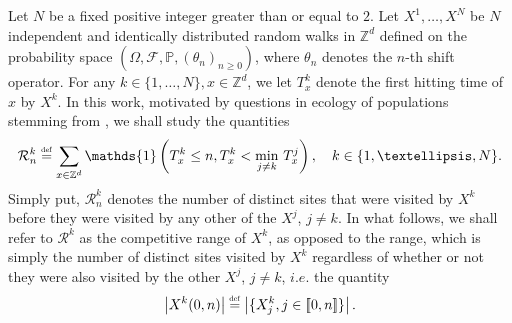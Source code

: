 \documentclass[10pt,a4paper]{amsart}
\newcommand{\R}{\mathcal R}
\newcommand{\PP}{\mathbb P}
\newcommand{\1}{\mathds{1}}
\newcommand{\ZZ}{\mathbb Z}
\newcommand{\eqdef}{\stackrel{\scaleto{\mathrm{def}}{3.5pt}}{=}}
\numberwithin{equation}{section}
\begin{document}
Let $N$ be a fixed positive integer greater than or equal to $2$. Let $X^1,\dots,X^N$ be $N$ independent and identically distributed random walks in $\ZZ^d$ defined on the probability space $\left(\Omega,\mathcal F,\PP,\left(\theta_n\right)_{n\ge0}\right)$, where $\theta_n$ denotes the $n$-th shift operator. For any $k\in\{1,\dots,N\},x\in\ZZ^d$, we let $T_x^k$ denote the first hitting time of $x$ by $X^k$. In this work, motivated by questions in ecology of populations stemming from \cite{Bansaye2024}, we shall study the quantities
\begin{equation*}
    \R_n^k\eqdef\sum_{x\in\ZZ^d}\1\left(T_x^k\le n,T_x^k<\underset{j\ne k}\min \ T_x^j\right),\quad k\in\{1,\dots,N\}.
\end{equation*}
Simply put, $\R_n^k$ denotes the number of distinct sites that were visited by $X^k$ before they were visited by any other of the $X^j$, $j\ne k$. In what follows, we shall refer to $\R^k$ as the competitive range of $X^k$, as opposed to the range, which is simply the number of distinct sites visited by $X^k$ regardless of whether or not they were also visited by the other $X^j$, $j\ne k$, $i.e.$ the quantity
\begin{equation*}
    \left|X^k(0,n)\right|\eqdef\left|\{X_j^k, j\in[\![0,n]\!]\}\right|.
\end{equation*} 
\end{document}
